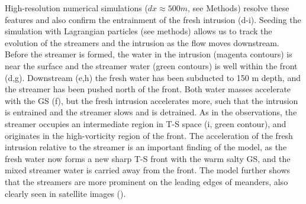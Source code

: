 \documentclass{natureJMK}
\begin{document}
High-resolution numerical simulations ($dx\approx 500 m$, see Methods) resolve these features and also confirm the entrainment of the fresh intrusion (d-i). Seeding the simulation with Lagrangian particles (see methods) allows us to track the evolution of the streamers and the intrusion as the flow moves downstream.  Before the streamer is formed, the water in the intrusion (magenta contours) is near the surface and the streamer water (green contours) is well within the front (d,g).  Downstream (e,h) the fresh water has been subducted to 150 m depth, and the streamer has been pushed north of the front.  Both water masses accelerate with the  GS  (f), but the fresh intrusion accelerates more, such that the intrusion is entrained and the streamer slows and is detrained.  As in the observations, the streamer occupies an intermediate region in T-S space (i, green contour), and originates in the high-vorticity region of the front.   The acceleration of the fresh intrusion relative to the streamer is an important finding of the model, as the fresh water now forms a new sharp T-S front with the warm salty GS, and the  mixed streamer water is carried away from the front.  The model further shows that the streamers are more prominent on the leading edges of meanders, also clearly seen in satellite images ().  

\end{document}
